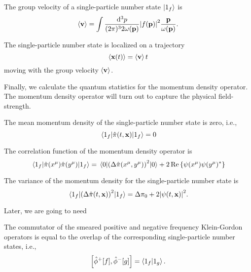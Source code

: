 \begin{lemma}\label{thm:single_particle_number_state_group_velocity}
	The group velocity of a single-particle number state $\ket{1_f}$ is
	\begin{equation}
		\expval{\vb{v}}
		=
		\int\frac{\dd[3]{p}}{(2\pi)^32\omega(\vb{p})}
		\abs{f(\vb{p})}^2
		\frac{\vb{p}}{\omega(\vb{p})}
		\label{eq:single_particle_number_state_group_velocity}
		.
	\end{equation}
\end{lemma}
\begin{lemma}
	The single-particle number state is localized on a trajectory
	\begin{equation}
		\expval{\vb{x}(t)}
		=
		\expval{\vb{v}}t
	\end{equation}
	moving with the group velocity $\expval{\vb{v}}$.
\end{lemma}
Finally, we calculate the quantum statistics for the momentum density operator.
The momentum density operator will turn out to capture the physical field-strength.
\begin{lemma}\label{thm:single_particle_number_state_momentum_density_mean}
	The mean momentum density of the single-particle number state is zero, i.e.,
	\begin{equation}
		\expval{\hat\pi(t,\vb{x})}{1_f}
		=
		0
	\end{equation}
\end{lemma}
\begin{lemma}\label{thm:single_particle_number_state_momentum_density_correlation}
	The correlation function of the momentum density operator is
	\begin{equation}
		\expval{\hat\pi(x^\mu)\hat\pi(y^\mu)}{1_f}
		=
		\expval{\left(\Delta\hat\pi(x^\mu,y^\mu)\right)^2}{0}
		+
		2\operatorname{\operatorname{Re}}\left\{
			\psi(x^\mu)
			\psi(y^\mu)^*
		\right\}
	\end{equation}
\end{lemma}
\begin{corollary}
	The variance of the momentum density for the single-particle number state is
	\begin{equation}
		\expval{\left(\Delta\hat\pi(t,\vb{x})\right)^2}{1_f}
		=
		\Delta\pi_0
		+
		2
		\abs{\psi(t,\vb{x})}^2
		.
	\end{equation}
\end{corollary}
Later, we are going to need
\begin{lemma}\label{thm:single_partiicle_number_state_inner_product_pn_smeared_kg_comm}
	The commutator of the smeared positive and negative frequency Klein-Gordon operators is equal to the overlap of the corresponding single-particle number states, i.e.,
	\begin{equation}
		\comm{\hat\phi^+[f]}{\hat\phi^-[g]}
		=
		\braket{1_f}{1_g}
		.
	\end{equation}
\end{lemma}

